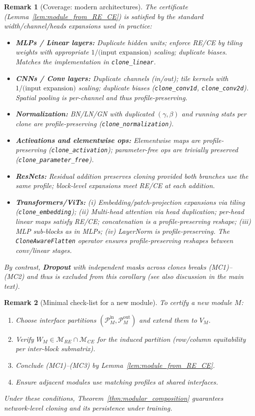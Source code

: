 \documentclass{article}
\newcommand{\ManifoldRE}{\mathcal{M}_{RE}}
\newcommand{\ManifoldCE}{\mathcal{M}_{CE}}
\newtheorem{remark}{Remark}[section]
\numberwithin{figure}{section}
\begin{document}
\begin{remark}[Coverage: modern architectures]
\label{rem:coverage}
The certificate (Lemma~\ref{lem:module_from_RE_CE}) is satisfied by the standard width/channel/heads expansions used in practice:
\begin{itemize}[leftmargin=1.5em]
\item \textbf{MLPs / Linear layers:} Duplicate hidden units; enforce RE/CE by tiling weights with appropriate $1/\text{(input expansion)}$ scaling; duplicate biases. Matches the implementation in \texttt{clone\_linear}.
\item \textbf{CNNs / Conv layers:} Duplicate channels (in/out); tile kernels with $1/\text{(input expansion)}$ scaling; duplicate biases (\texttt{clone\_conv1d}, \texttt{clone\_conv2d}). Spatial pooling is per-channel and thus profile-preserving. 
\item \textbf{Normalization:} BN/LN/GN with duplicated $(\gamma,\beta)$ and running stats per clone are profile-preserving (\texttt{clone\_normalization}).
\item \textbf{Activations and elementwise ops:} Elementwise maps are profile-preserving (\texttt{clone\_activation}); parameter-free ops are trivially preserved (\texttt{clone\_parameter\_free}).
\item \textbf{ResNets:} Residual addition preserves cloning provided both branches use the same profile; block-level expansions meet RE/CE at each addition.
\item \textbf{Transformers/ViTs:} 
      (i) Embedding/patch-projection expansions via tiling (\texttt{clone\_embedding}); 
      (ii) Multi-head attention via head duplication; per-head linear maps satisfy RE/CE; concatenation is a profile-preserving reshape; 
      (iii) MLP sub-blocks as in MLPs; 
      (iv) LayerNorm is profile-preserving.
      The \texttt{CloneAwareFlatten} operator ensures profile-preserving reshapes between conv/linear stages.
\end{itemize}
By contrast, \textbf{Dropout} with independent masks across clones breaks (MC1)–(MC2) and thus is excluded from this corollary (see also discussion in the main text).
\end{remark}

\begin{remark}[Minimal check-list for a new module]
\label{rem:checklist}
To certify a new module $M$:
\begin{enumerate}[leftmargin=1.5em]
\item Choose interface partitions $(\mathcal{P}^\mathrm{in}_M,\mathcal{P}^\mathrm{out}_M)$ and extend them to $V_M$.
\item Verify $W_M\in\ManifoldRE\cap\ManifoldCE$ for the induced partition (row/column equitability per inter-block submatrix).
\item Conclude (MC1)–(MC3) by Lemma~\ref{lem:module_from_RE_CE}.
\item Ensure adjacent modules use matching profiles at shared interfaces.
\end{enumerate}
Under these conditions, Theorem~\ref{thm:modular_composition} guarantees network-level cloning and its persistence under training.
\end{remark}
\end{document}
